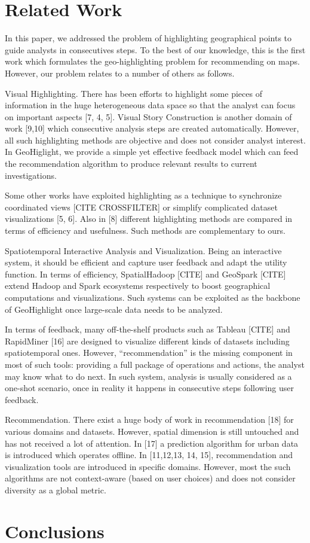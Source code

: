 \documentclass{sig-alternate-05-2015}
\begin{document}
\section{Related Work}\label{sec:related-works}

In this paper, we addressed the problem of highlighting geographical points to guide analysts in consecutives steps. To the best of our knowledge, this is the first work which formulates the geo-highlighting problem for recommending on maps. However, our problem relates to a number of others as follows.

Visual Highlighting. There has been efforts to highlight some pieces of information in the huge heterogeneous data space so that the analyst can focus on important aspects [7, 4, 5]. Visual Story Construction is another domain of work [9,10] which consecutive analysis steps are created automatically. However, all such highlighting methods are objective and does not consider analyst interest. In GeoHiglight, we provide a simple yet effective feedback model which can feed the recommendation algorithm to produce relevant results to current investigations.

Some other works have exploited highlighting as a technique to synchronize coordinated views [CITE CROSSFILTER] or simplify complicated dataset visualizations [5, 6]. Also in [8] different highlighting methods are compared in terms of efficiency and usefulness. Such methods are complementary to ours.

Spatiotemporal Interactive Analysis and Visualization. Being an interactive system, it should be efficient and capture user feedback and adapt the utility function. In terms of efficiency, SpatialHadoop [CITE] and GeoSpark [CITE] extend Hadoop and Spark ecosystems respectively to boost geographical computations and visualizations. Such systems can be exploited as the backbone of GeoHighlight once large-scale data needs to be analyzed.

In terms of feedback, many off-the-shelf products such as Tableau [CITE] and
RapidMiner [16] are designed to visualize different kinds of datasets including
spatiotemporal ones. However, ``recommendation'' is the missing component in
most of such tools: providing a full package of operations and actions, the analyst
may know what to do next. In such system, analysis is usually considered as a
one-shot scenario, once in reality it happens in consecutive steps following
user feedback.        

Recommendation. There exist a huge body of work in recommendation [18] for various domains and datasets. However, spatial dimension is still untouched and has not received a lot of attention. In [17] a prediction algorithm for urban data is introduced which operates offline. In [11,12,13, 14, 15], recommendation and visualization tools are introduced in specific domains. However, most the such algorithms are not context-aware (based on user choices) and does not consider diversity as a global metric.

\section{Conclusions}\label{sec:conclusions}



 
\end{document}
